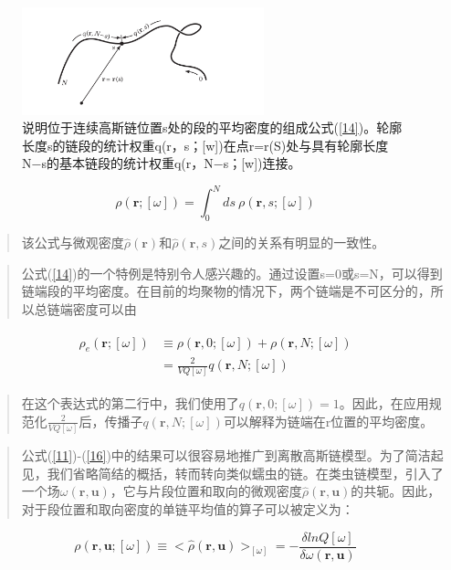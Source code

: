 \begin{figure}[ht]
\centering
\includegraphics[width=7cm]{32.png}
\caption{说明位于连续高斯链位置s处的段的平均密度的组成公式(\ref{14})。轮廓长度s的链段的统计权重q(r，s；[w])在点r=r(S)处与具有轮廓长度N−s的基本链段的统计权重q(r，N−s；[w])连接。}
\label{figure1}
\end{figure}
\begin{equation}\label{15}
\rho(\mathbf{r};[\omega])=\int_{0}^{N}ds~\rho(\mathbf{r},s;[\omega])
\end{equation}
\begin{quotation}
该公式与微观密度$\hat{\rho}(\mathbf{r})$和$\hat{\rho}(\mathbf{r},s)$之间的关系有明显的一致性。
\end{quotation}
\begin{quotation}
公式(\ref{14})的一个特例是特别令人感兴趣的。通过设置s=0或s=N，可以得到链端段的平均密度。在目前的均聚物的情况下，两个链端是不可区分的，所以总链端密度可以由
\end{quotation}
\begin{align}\label{16}
\begin{split}
\rho_e(\mathbf{r};[\omega])&\equiv \rho(\mathbf{r},0;[\omega])+\rho(\mathbf{r},N;[\omega])\\  &=\frac{2}{VQ[\omega]}q(\mathbf{r},N;[\omega])
\end{split}
\end{align}
\begin{quotation}
在这个表达式的第二行中，我们使用了$q(\mathbf{r},0;[\omega])=1$。因此，在应用规范化$\frac{2}{VQ[\omega]}$后，传播子$q(\mathbf{r},N;[\omega])$可以解释为链端在r位置的平均密度。
\end{quotation}
\begin{quotation}
公式(\ref{11})-(\ref{16})中的结果可以很容易地推广到离散高斯链模型。为了简洁起见，我们省略简结的概括，转而转向类似蠕虫的链。在类虫链模型，引入了一个场$\omega(\mathbf{r},\mathbf{u})$，它与片段位置和取向的微观密度$\hat{\rho}(\mathbf{r},\mathbf{u})$的共轭。因此，对于段位置和取向密度的单链平均值的算子可以被定义为：
\end{quotation}
\begin{equation}\label{17}
\rho(\mathbf{r},\mathbf{u};[\omega])\equiv <\hat{\rho}(\mathbf{r},\mathbf{u})>_{[\omega]}=-\frac{\delta lnQ[\omega]}{\delta \omega(\mathbf{r},\mathbf{u})}
\end{equation}
